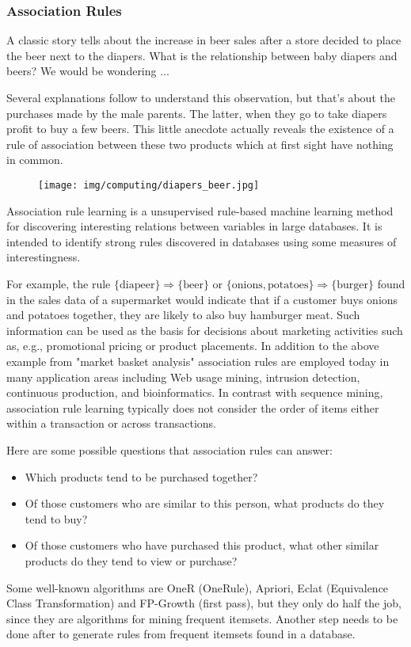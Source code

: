 	\pagebreak
	\subsubsection{Association Rules}
	A classic story tells about the increase in beer sales after a store decided to place the beer next to the diapers. What is the relationship between baby diapers and beers? We would be wondering ...
	
	Several explanations follow to understand this observation, but that's about the purchases made by the male parents. The latter, when they go to take diapers profit to buy a few beers. This little anecdote actually reveals the existence of a rule of association between these two products which at first sight have nothing in common.
	\begin{figure}[H]
		\centering
		\texttt{[image: img/computing/diapers\_beer.jpg]}
	\end{figure}
	
	Association rule learning is a unsupervised rule-based machine learning method for discovering interesting relations between variables in large databases. It is intended to identify strong rules discovered in databases using some measures of interestingness.
	
	 For example, the rule  ${\displaystyle \{\mathrm {diapeer} \}\Rightarrow \{\mathrm {beer} \}}$ or ${\displaystyle \{\mathrm {onions,potatoes} \}\Rightarrow \{\mathrm {burger} \}}$  found in the sales data of a supermarket would indicate that if a customer buys onions and potatoes together, they are likely to also buy hamburger meat. Such information can be used as the basis for decisions about marketing activities such as, e.g., promotional pricing or product placements. In addition to the above example from "market basket analysis" association rules are employed today in many application areas including Web usage mining, intrusion detection, continuous production, and bioinformatics. In contrast with sequence mining, association rule learning typically does not consider the order of items either within a transaction or across transactions.
	
	Here are some possible questions that association rules can answer:
	\begin{itemize}
		\item Which products tend to be purchased together?
		\item Of those customers who are similar to this person, what products do they tend to buy?
		\item Of those customers who have purchased this product, what other similar products do they tend to
		view or purchase?
	\end{itemize}
	Some well-known algorithms are OneR (OneRule), Apriori, Eclat (Equivalence Class Transformation) and FP-Growth (first pass), but they only do half the job, since they are algorithms for mining frequent itemsets. Another step needs to be done after to generate rules from frequent itemsets found in a database.
	
